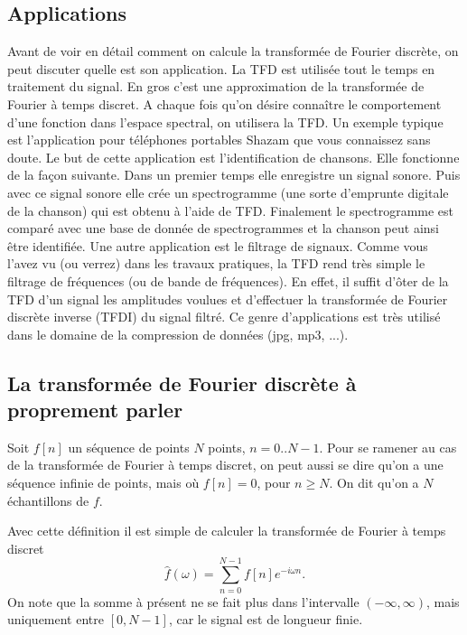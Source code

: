 \documentclass[a4paper,12pt]{book}
\newcommand{\fh}{\hat{f}}
\begin{document}
\subsection{Applications}

Avant de voir en détail comment on calcule la transformée de Fourier discrète, 
on peut discuter quelle est son application. La TFD est utilisée tout le temps en traitement du signal.
En gros c'est une approximation de la transformée de Fourier à temps discret. A chaque fois qu'on désire connaître le comportement d'une fonction dans l'espace spectral, on utilisera la TFD. Un exemple typique 
est l'application pour téléphones portables Shazam que vous connaissez sans doute. Le but de cette application est l'identification de chansons. Elle fonctionne de la façon suivante. Dans un premier temps elle enregistre un signal sonore. Puis avec ce signal sonore elle crée un spectrogramme (une sorte d'emprunte digitale de la chanson) qui est obtenu à l'aide de TFD. Finalement le spectrogramme est comparé avec une base de donnée de spectrogrammes et la chanson peut ainsi être identifiée. Une autre application est le filtrage de signaux. Comme vous l'avez vu (ou verrez) dans les travaux pratiques, 
la TFD rend très simple le filtrage de fréquences (ou de bande de fréquences). En effet, il suffit d'ôter de la TFD d'un signal les amplitudes voulues et d'effectuer la transformée de Fourier discrète inverse (TFDI) du signal filtré. Ce genre d'applications est très utilisé dans le domaine de la compression 
de données (jpg, mp3, ...).

\subsection{La transformée de Fourier discrète à proprement parler}

Soit $f[n]$ un séquence de points $N$ points, $n=0..N-1$. 
Pour se ramener au cas de la transformée de 
Fourier à temps discret, on peut aussi se dire qu'on a une séquence 
infinie de points, mais où $f[n]=0$, pour $n\geq N$. 
On dit qu'on a $N$ échantillons de $f$.

Avec cette définition il est simple de calculer la transformée de Fourier à temps discret
\begin{equation}
 \fh(\omega)=\sum_{n=0}^{N-1} f[n] e^{-i\omega n}.\label{eq_tftd_fini}
\end{equation}
On note que la somme à présent ne se fait plus dans l'intervalle $(-\infty,\infty)$, 
mais uniquement entre $[0,N-1]$, car le signal est de longueur finie.
\end{document}

